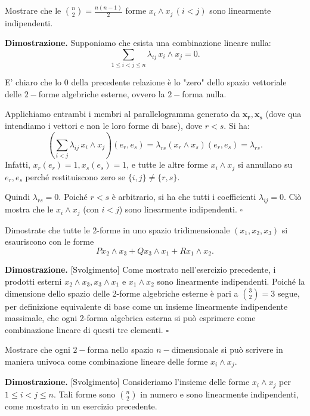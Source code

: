 %
\vspace{0.5cm}
\begin{exercise}
    Mostrare che le $\binom{n}{2} = \frac{n(n-1)}{2}$ forme $x_i \wedge x_j \, (i < j)$ sono linearmente indipendenti.
\end{exercise}
%
\noindent \textbf{Dimostrazione. }
    Supponiamo che esista una combinazione lineare nulla:
    \[
        \sum_{1 \le i < j \le n} \lambda_{ij} \, x_i \wedge x_j = 0.
    \]
    \begin{remark}
        E' chiaro che lo $0$ della precedente relazione è lo "zero" dello spazio vettoriale delle $2-$forme algebriche esterne, ovvero la $2-$forma nulla.
    \end{remark}
    Applichiamo entrambi i membri al parallelogramma generato da \( \mathbf{x_r}, \mathbf{x_s} \) (dove qua intendiamo i vettori e non le loro forme di base), dove \( r < s \). Si ha:
    \[
        \left( \sum_{i < j} \lambda_{ij} \, x_i \wedge x_j \right)(e_r, e_s) = \lambda_{rs} (x_r \wedge x_s)(e_r, e_s) = \lambda_{rs}.
    \]
    Infatti, \( x_r(e_r) = 1, x_s(e_s) = 1 \), e tutte le altre forme \( x_i \wedge x_j \) si annullano su \( e_r, e_s \) perché restituiscono zero se \( \{i,j\} \ne \{r,s\} \).

    Quindi \( \lambda_{rs} = 0 \). Poiché \( r < s \) è arbitrario, si ha che tutti i coefficienti \( \lambda_{ij} = 0 \). Ciò mostra che le \( x_i \wedge x_j \) (con \( i < j \)) sono linearmente indipendenti.
\hfill $\square$
%
\vspace{0.5cm}
\begin{exercise}
    Dimostrate che tutte le 2-forme in uno spazio tridimensionale $(x_1, x_2, x_3)$ si esauriscono con le forme
    $$
        P x_2 \wedge x_3 + Q x_3 \wedge x_1 + R x_1 \wedge x_2.
    $$
\end{exercise}
%
\noindent \textbf{Dimostrazione. } [Svolgimento]
    Come mostrato nell'esercizio precedente, i prodotti esterni \( x_2 \wedge x_3, x_3 \wedge x_1 \) e \( x_1 \wedge x_2 \) sono linearmente indipendenti. Poiché la dimensione dello spazio delle 2-forme algebriche esterne è pari a \( \binom{3}{2} = 3 \) segue, per definizione equivalente di base come un insieme linearmente indipendente massimale, che ogni 2-forma algebrica esterna si può esprimere come combinazione lineare di questi tre elementi.
\hfill $\square$
%
\vspace{0.5cm}
\begin{exercise}
    Mostrare che ogni $2-$forma nello spazio $n-$dimensionale si può scrivere in maniera univoca come combinazione lineare delle forme $x_i \wedge x_j$.
\end{exercise}
%
\noindent \textbf{Dimostrazione. } [Svolgimento]
    Consideriamo l'insieme delle forme $x_i \wedge x_j$ per $1 \le i < j \le n$. Tali forme sono $ \binom{n}{2} $ in numero e sono linearmente indipendenti, come mostrato in un esercizio precedente.

